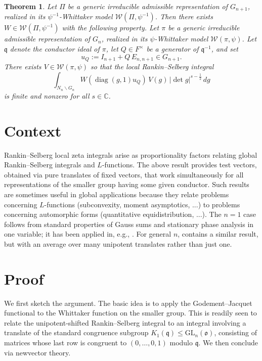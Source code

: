 \documentclass[reqno]{amsart}
\theoremstyle{plain}
\newtheorem{theorem}{Theorem}
\theoremstyle{definition}
\begin{document}
\begin{theorem}\label{thm:main}
  Let \(\Pi\) be a generic irreducible admissible representation of \(G_{n+1}\), realized in its \(\psi^{-1}\)-Whittaker model \(\mathcal W(\Pi,\psi^{-1})\). Then there exists \(W\in \mathcal W(\Pi,\psi^{-1})\) with the following property.  Let $\pi$ be a generic irreducible admissible representation of \(G_n\), realized in its $\psi$-Whittaker model \(\mathcal W(\pi,\psi)\).  Let $\mathfrak{q}$ denote the conductor ideal of $\pi$, let \(Q\in F^\times\) be a generator of \(\mathfrak q^{-1}\), and set
  \[
    u_Q := I_{n+1} + Q\,E_{n,n+1} \in G_{n + 1}.
  \]
  There exists \(V\in \mathcal W(\pi,\psi)\) so that the local Rankin--Selberg integral
  \[
    \int_{N_n\backslash G_n} W(\operatorname{diag}(g,1) u_Q)\,V(g)\,|\det g|^{s-\frac12}\,dg
  \]
is finite and nonzero for all \(s\in\mathbb C\).
\end{theorem}

\section{Context}

Rankin--Selberg local zeta integrals arise as proportionality factors relating global Rankin--Selberg integrals and $L$-functions.  The above result provides test vectors, obtained via pure translates of fixed vectors, that work simultaneously for all representations of the smaller group having some given conductor.  Such results are sometimes useful in global applications because they relate problems concerning $L$-functions (subconvexity, moment asymptotics, ...) to problems concerning automorphic forms (quantitative equidistribution, ...).  The $n = 1$ case follows from standard properties of Gauss sums and stationary phase analysis in one variable; it has been applied in, e.g., \cite{MR780071, michel-2009}.  For general \(n\), \cite{MR4053059} contains a similar result, but with an average over many unipotent translates rather than just one.

\section{Proof}\label{sec:proof}
We first sketch the argument.  The basic idea is to apply the Godement--Jacquet functional to the Whittaker function on the smaller group.  This is readily seen to relate the unipotent-shifted Rankin--Selberg integral to an integral involving a translate of the standard congruence subgroup $K_1(\mathfrak{q}) \leq \mathrm{GL}_n(\mathfrak{o})$, consisting of matrices whose last row is congruent to \((0,\dotsc,0,1)\) modulo \(\mathfrak q\).  We then conclude via newvector theory.
\end{document}
